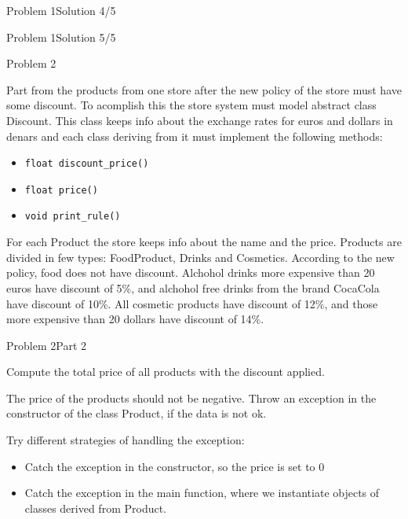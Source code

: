 \begin{frame}[fragile]{Problem 1}{Solution 4/5}

\end{frame}

\begin{frame}[fragile]{Problem 1}{Solution 5/5}

\end{frame}


\begin{frame}{Problem 2}
\begin{scriptsize}
Part from the products from one store after the new policy of the store must
have some discount. To acomplish this the store system must model abstract class
Discount. This class keeps info about the exchange rates for euros and dollars
in denars and each class deriving from it must implement the following methods:

\begin{itemize}
  \item \texttt{float discount\_price()}
  \item  \texttt{float price()}
  \item \texttt{void print\_rule()}
\end{itemize}

For each Product the store keeps info about the name and the price. Products are
divided in few types: FoodProduct, Drinks and Cosmetics. According to the new
policy, food does not have discount. Alchohol drinks more expensive than 20
euros have discount of 5\%, and alchohol free drinks from the brand CocaCola
have discount of 10\%. All cosmetic products have discount of 12\%, and those
more expensive than 20 dollars have discount of 14\%.

\end{scriptsize}
 
\end{frame}

\begin{frame}{Problem 2}{Part 2}
\begin{scriptsize}
Compute the total price of all products with the discount applied.

The price of the products should not be negative. Throw an exception in the
constructor of the class Product, if the data is not ok.

Try different strategies of handling the exception:
\begin{itemize}
  \item Catch the exception in the constructor, so the price is set to 0
  \item Catch the exception in the main function, where we instantiate objects
  of classes derived from Product.
\end{itemize}

\end{scriptsize}
\end{frame}

